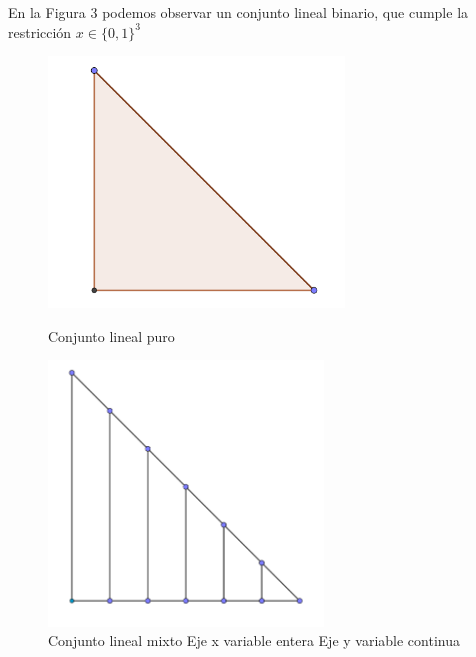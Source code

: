 \begin{eje}
En la Figura 3 podemos observar un conjunto lineal binario, que cumple la restricción $x \in \{0,1\}^3$
\begin{figure}[h!]
    \centering
    \begin{minipage}{0.45\textwidth}
        \centering
        \includegraphics[width=0.7\textwidth]{Img1.PNG} %
        \caption{Conjunto lineal puro}
    \end{minipage}\hfill
    \begin{minipage}{0.45\textwidth}
        \centering
        \includegraphics[width=0.65\textwidth]{Img2.PNG} %
        \caption{Conjunto lineal mixto \newline \hspace*{1.5cm} Eje x variable entera \newline \hspace*{1.5cm} Eje y variable continua}
    \end{minipage}
\end{figure}

\end{eje}
